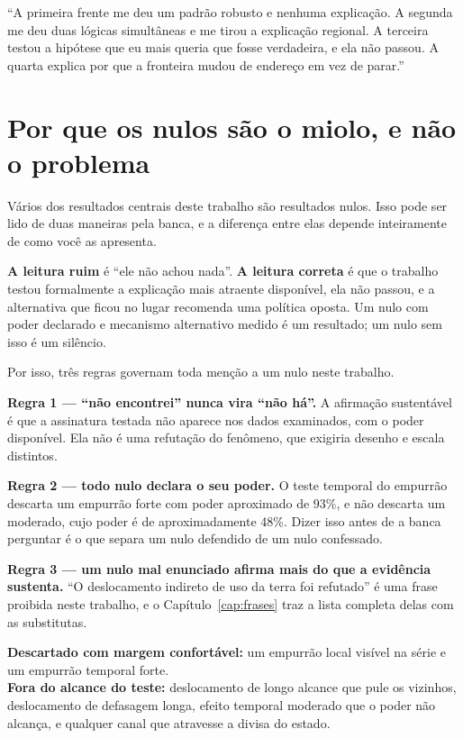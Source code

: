 \begin{nabanca}
``A primeira frente me deu um padrão robusto e nenhuma explicação. A segunda me
deu duas lógicas simultâneas e me tirou a explicação regional. A terceira testou
a hipótese que eu mais queria que fosse verdadeira, e ela não passou. A quarta
explica por que a fronteira mudou de endereço em vez de parar.''
\end{nabanca}

\chapter{Por que os nulos são o miolo, e não o problema}

Vários dos resultados centrais deste trabalho são resultados nulos. Isso pode
ser lido de duas maneiras pela banca, e a diferença entre elas depende
inteiramente de como você as apresenta.

\textbf{A leitura ruim} é ``ele não achou nada''. \textbf{A leitura correta} é
que o trabalho testou formalmente a explicação mais atraente disponível, ela
não passou, e a alternativa que ficou no lugar recomenda uma política oposta.
Um nulo com poder declarado e mecanismo alternativo medido é um resultado; um
nulo sem isso é um silêncio.

Por isso, três regras governam toda menção a um nulo neste trabalho.

\vspace{4pt}
\textbf{Regra 1 --- ``não encontrei'' nunca vira ``não há''.} A afirmação
sustentável é que a assinatura testada não aparece nos dados examinados, com o
poder disponível. Ela não é uma refutação do fenômeno, que exigiria desenho e
escala distintos.

\textbf{Regra 2 --- todo nulo declara o seu poder.} O teste temporal do empurrão
descarta um empurrão forte com poder aproximado de 93\%, e não descarta um
moderado, cujo poder é de aproximadamente 48\%. Dizer isso antes de a banca
perguntar é o que separa um nulo defendido de um nulo confessado.

\textbf{Regra 3 --- um nulo mal enunciado afirma mais do que a evidência
sustenta.} ``O deslocamento indireto de uso da terra foi refutado'' é uma frase
proibida neste trabalho, e o Capítulo~\ref{cap:frases} traz a lista completa
delas com as substitutas.

\begin{ancora}
\textbf{Descartado com margem confortável:} um empurrão local visível na série e
um empurrão temporal forte. \\
\textbf{Fora do alcance do teste:} deslocamento de longo alcance que pule os
vizinhos, deslocamento de defasagem longa, efeito temporal moderado que o poder
não alcança, e qualquer canal que atravesse a divisa do estado.
\end{ancora}

